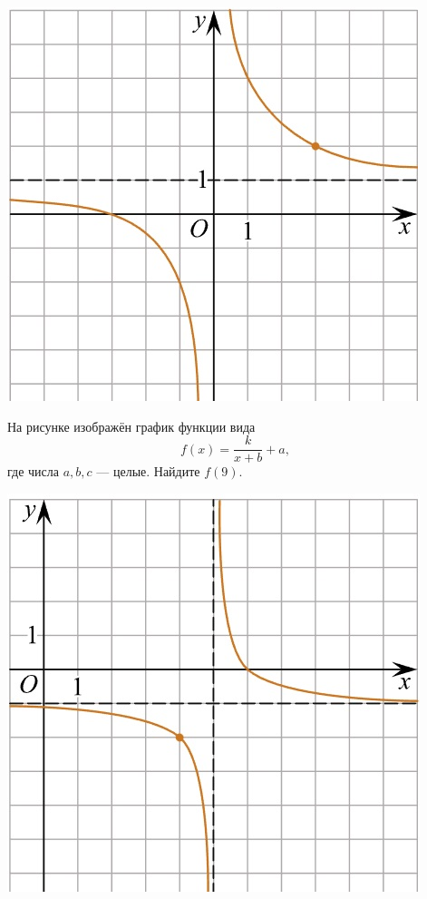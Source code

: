 \begin{class}[number=5]
\begin{listofex}
\begin{minipage}[t]{\picwidth}
			\includegraphics[align=t, width=\linewidth]{pics/G101M4C5-1.jpg}
		\end{minipage}
		\item
		\begin{minipage}[t]{\bodywidth}
			На рисунке изображён график функции вида \[ f(x)=\dfrac{k}{x+b}+a, \] где числа \(a, b, c\) --- целые. Найдите \(f(9)\).
		\end{minipage}
		\hspace{0.05\linewidth}
		\begin{minipage}[t]{\picwidth}
			\includegraphics[align=t, width=\linewidth]{pics/G101M4C5-2.jpg}

\end{minipage}
\end{listofex}
\end{class}
